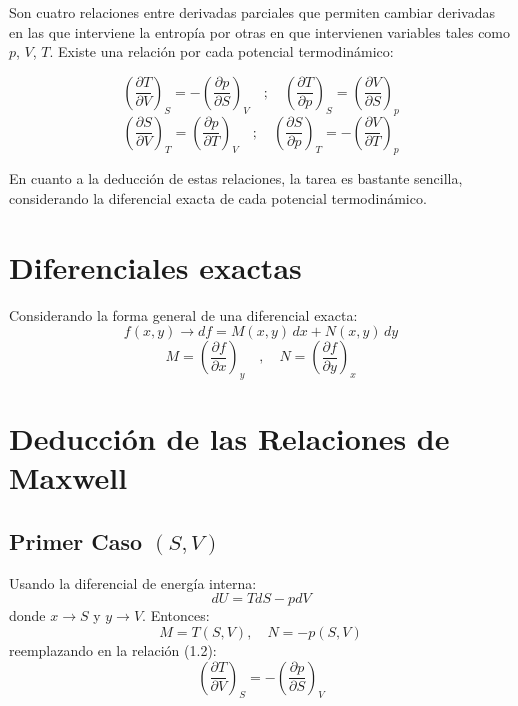 
Son cuatro relaciones entre derivadas parciales que permiten cambiar derivadas en las que interviene la entropía por otras en que intervienen variables tales como $p$, $V$, $T$.  
Existe una relación por cada potencial termodinámico:

\[
\left(\frac{\partial T}{\partial V}\right)_S=-\left(\frac{\partial p}{\partial S}\right)_V 
\quad ;\quad 
\left(\frac{\partial T}{\partial p}\right)_S=\left(\frac{\partial V}{\partial S}\right)_p 
\]
\[
\left(\frac{\partial S}{\partial V}\right)_T=\left(\frac{\partial p}{\partial T}\right)_V 
\quad ;\quad 
\left(\frac{\partial S}{\partial p}\right)_T=-\left(\frac{\partial V}{\partial T}\right)_p
\]

En cuanto a la deducción de estas relaciones, la tarea es bastante sencilla, considerando la diferencial exacta de cada potencial termodinámico.

\section{Diferenciales exactas}

Considerando la forma general de una diferencial exacta:
\begin{equation}
    f(x,y) \rightarrow df = M(x,y)\,dx + N(x,y)\,dy \tag{1.1}
\end{equation}
\begin{equation}
    M = \left( \frac{\partial f}{\partial x}\right)_y  \quad ,\quad 
    N=\left( \frac{\partial f}{\partial y} \right)_x \tag{1.2}
\end{equation}

\section{Deducción de las Relaciones de Maxwell}

\subsection{Primer Caso $(S, V)$}
Usando la diferencial de energía interna:
\[
dU=TdS-pdV
\]
donde $x\rightarrow S$ y $y \rightarrow V$. Entonces:
\[
M=T(S,V), \quad N=-p(S,V)
\]
reemplazando en la relación (1.2):
\begin{equation}
    \boxed{
    \left( \frac{\partial  T}{\partial V} \right)_S = -\left( \frac{\partial p}{\partial  S} \right)_V
    }
\end{equation}

